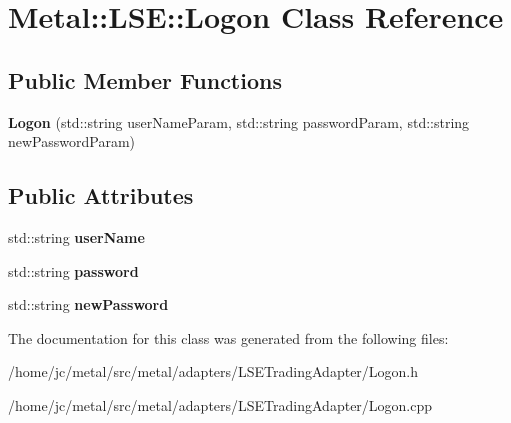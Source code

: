 \hypertarget{classMetal_1_1LSE_1_1Logon}{}\section{Metal\+:\+:L\+S\+E\+:\+:Logon Class Reference}
\label{classMetal_1_1LSE_1_1Logon}
\subsection*{Public Member Functions}
\begin{DoxyCompactItemize}
\item 
\hypertarget{classMetal_1_1LSE_1_1Logon_afdff6d189d154169b3f0c32a0ca1d134}{}{\bfseries Logon} (std\+::string user\+Name\+Param, std\+::string password\+Param, std\+::string new\+Password\+Param)\label{classMetal_1_1LSE_1_1Logon_afdff6d189d154169b3f0c32a0ca1d134}

\end{DoxyCompactItemize}
\subsection*{Public Attributes}
\begin{DoxyCompactItemize}
\item 
\hypertarget{classMetal_1_1LSE_1_1Logon_a10fa4ed887ed159b7157e5aab908b18f}{}std\+::string {\bfseries user\+Name}\label{classMetal_1_1LSE_1_1Logon_a10fa4ed887ed159b7157e5aab908b18f}

\item 
\hypertarget{classMetal_1_1LSE_1_1Logon_ae8181000986aeb93bf3e3b989fc238ae}{}std\+::string {\bfseries password}\label{classMetal_1_1LSE_1_1Logon_ae8181000986aeb93bf3e3b989fc238ae}

\item 
\hypertarget{classMetal_1_1LSE_1_1Logon_a53afe9b298d908d8580462e9af4cdd5a}{}std\+::string {\bfseries new\+Password}\label{classMetal_1_1LSE_1_1Logon_a53afe9b298d908d8580462e9af4cdd5a}

\end{DoxyCompactItemize}


The documentation for this class was generated from the following files\+:\begin{DoxyCompactItemize}
\item 
/home/jc/metal/src/metal/adapters/\+L\+S\+E\+Trading\+Adapter/Logon.\+h\item 
/home/jc/metal/src/metal/adapters/\+L\+S\+E\+Trading\+Adapter/Logon.\+cpp\end{DoxyCompactItemize}
